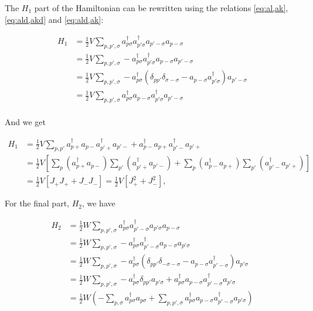The $H_1$ part of the Hamiltonian can be rewritten using the relations \ref{eq:al,ak},\ref{eq:ald,akd} and \ref{eq:ald,ak}:

\begin{align*}
H_1 &= \frac{1}{2} V \sum_{p,p',\sigma}
a_{p\sigma}^\dagger a_{p'\sigma}^\dagger a_{p'-\sigma} a_{p-\sigma} \\
&= \frac{1}{2} V \sum_{p,p',\sigma}
-a_{p\sigma}^\dagger a_{p'\sigma}^\dagger a_{p-\sigma} a_{p'-\sigma} \\
&= \frac{1}{2} V \sum_{p,p',\sigma}
-a_{p\sigma}^\dagger \left( \delta_{pp'} \delta_{\sigma -\sigma} - a_{p-\sigma} a_{p'\sigma}^\dagger \right) a_{p'-\sigma} \\
&= \frac{1}{2} V \sum_{p,p',\sigma}
a_{p\sigma}^\dagger a_{p-\sigma} a_{p'\sigma}^\dagger a_{p'-\sigma} \\
\end{align*}

And we get

\begin{align*}
H_1 &= \frac{1}{2} V\sum_{p,p'}
a_{p+}^\dagger a_{p-} a_{p'+}^\dagger a_{p'-} +
a_{p-}^\dagger a_{p+} a_{p'-}^\dagger a_{p'+} \\
&= \frac{1}{2} V \left[ \sum_p \left( a_{p+}^\dagger a_{p-} \right)
\sum_{p'} \left( a_{p'+}^\dagger a_{p'-} \right) +
\sum_p \left( a_{p-}^\dagger a_{p+} \right)
\sum_{p'} \left( a_{p'-}^\dagger a_{p'+} \right) \right] \\
&= \frac{1}{2} V \left[ J_+ J_+ + J_- J_- \right] = \frac{1}{2} V \left[ J_+^2 + J_-^2 \right] ,
\end{align*}

For the final part, $H_2$, we have

\begin{align*}
H_2 &= \frac{1}{2} W \sum_{p,p',\sigma}
a_{p\sigma}^\dagger a_{p'-\sigma}^\dagger a_{p'\sigma} a_{p-\sigma} \\
&= \frac{1}{2} W \sum_{p,p',\sigma}
-a_{p\sigma}^\dagger a_{p'-\sigma}^\dagger a_{p-\sigma} a_{p'\sigma} \\
&= \frac{1}{2} W \sum_{p,p',\sigma}
-a_{p\sigma}^\dagger \left( \delta_{pp'} \delta_{-\sigma -\sigma} -
a_{p-\sigma} a_{p'-\sigma}^\dagger \right) a_{p'\sigma} \\
&= \frac{1}{2} W \sum_{p,p',\sigma}
-a_{p\sigma}^\dagger \delta_{pp'} a_{p'\sigma} +
a_{p\sigma}^\dagger a_{p-\sigma} a_{p'-\sigma}^\dagger a_{p'\sigma} \\
&= \frac{1}{2} W \left( -\sum_{p,\sigma}
a_{p\sigma}^\dagger a_{p\sigma} +
\sum_{p,p',\sigma} a_{p\sigma}^\dagger a_{p-\sigma} a_{p'-\sigma}^\dagger a_{p'\sigma} \right) \\
\end{align*}

